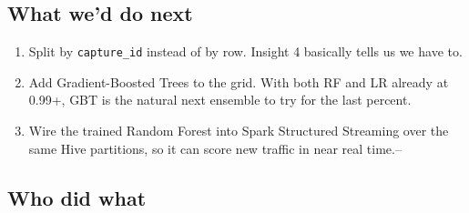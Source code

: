 \documentclass[11pt,a4paper]{article}
\begin{document}
\subsection{What we'd do next}

\begin{enumerate}[leftmargin=2em]
    \item Split by \texttt{capture\_id} instead of by row. Insight 4
    basically tells us we have to.
    \item Add Gradient-Boosted Trees to the grid. With both RF and LR
    already at 0.99+, GBT is the natural next ensemble to try for the
    last percent.
    \item Wire the trained Random Forest into Spark Structured Streaming
    over the same Hive partitions, so it can score new traffic in near
    real time.–
\end{enumerate}

\subsection{Who did what}
\end{document}
